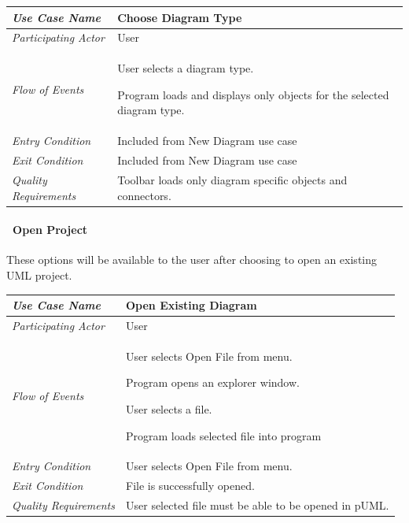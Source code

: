 \documentclass[twoside,letterpaper]{article}
\newenvironment{my_enumerate}{
\begin{enumerate}
  \setlength{\itemsep}{1pt}
  \setlength{\parskip}{0pt}
  \setlength{\parsep}{0pt}}{\end{enumerate}
}
\begin{document}
\begin{flushleft}
\tablehead{}
\begin{tabular}{|m{2.0in} m{5.0in}|}
\hline
{\bfseries\emph{Use Case Name}}
& {\bfseries Choose Diagram Type}
\\\hline
\emph{Participating Actor}
& User 
\\\hline
\emph{Flow of Events}
& \begin{my_enumerate}
\item User selects a diagram type.
\item Program loads and displays only objects for the selected diagram type.
\end{my_enumerate}
\\\hline
\emph{Entry Condition}
& Included from New Diagram use case
\\\hline
\emph{Exit Condition}
& Included from New Diagram use case
\\\hline
\emph{Quality Requirements}
& Toolbar loads only diagram specific objects and connectors.
\\\hline
\end{tabular}
\end{flushleft}
\bigskip

\clearpage


\paragraph[\ Use Category]
{\ Open Project} {These options will be available to the user after choosing to open an existing UML project.}

\begin{flushleft}
\tablehead{}
\begin{tabular}{|m{2.0in} m{5.0in}|}
\hline
{\bfseries\emph{Use Case Name}}
& {\bfseries Open Existing Diagram}
\\\hline
\emph{Participating Actor}
& User
\\\hline
\emph{Flow of Events}
& \begin{my_enumerate}
\item User selects Open File from menu.
\item Program opens an explorer window.
\item User selects a file.
\item Program loads selected file into program
\end{my_enumerate}
\\\hline
\emph{Entry Condition}
& User selects Open File from menu.
\\\hline
\emph{Exit Condition}
& File is successfully opened.
\\\hline
\emph{Quality Requirements}
& User selected file must be able to be opened in pUML.
\\\hline
\end{tabular}
\end{flushleft}
\bigskip
\end{document}
